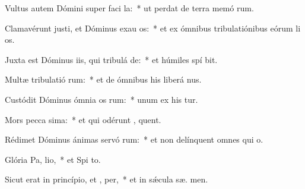 \item Vultus autem Dómini super faci la:~* ut perdat de terra memó rum.
\item Clamavérunt justi, et Dóminus exau os:~* et ex ómnibus tribulatiónibus eórum li os.
\item Juxta est Dóminus iis, qui tribulá  de:~* et húmiles spí bit.
\item Multæ tribulatió rum:~* et de ómnibus his liberá  nus.
\item Custódit Dóminus ómnia os rum:~* unum ex his  tur.
\item Mors pecca sima:~* et qui odérunt , quent.
\item Rédimet Dóminus ánimas servó rum:~* et non delínquent omnes qui   o.
\item Glória Pa,  lio,~* et Spi to.
\item Sicut erat in princípio, et ,  per,~* et in sǽcula sæ. men.
